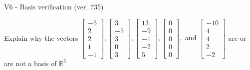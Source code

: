 \begin{exercise}
  \begin{exerciseTitle}V6 - Basis verification (ver. 735)\end{exerciseTitle}
  \begin{exerciseStatement}
    Explain why the vectors \(\left[\begin{array}{r}
-5 \\
2 \\
2 \\
1 \\
-1
\end{array}\right] , \left[\begin{array}{r}
3 \\
-5 \\
3 \\
0 \\
3
\end{array}\right] , \left[\begin{array}{r}
13 \\
-9 \\
-1 \\
-2 \\
5
\end{array}\right] , \left[\begin{array}{r}
0 \\
0 \\
0 \\
0 \\
0
\end{array}\right] , \text{ and } \left[\begin{array}{r}
-10 \\
4 \\
4 \\
2 \\
-2
\end{array}\right]\) are or are not a basis of \(\mathbb{R}^5\)	



\end{exerciseStatement}
\end{exercise}

